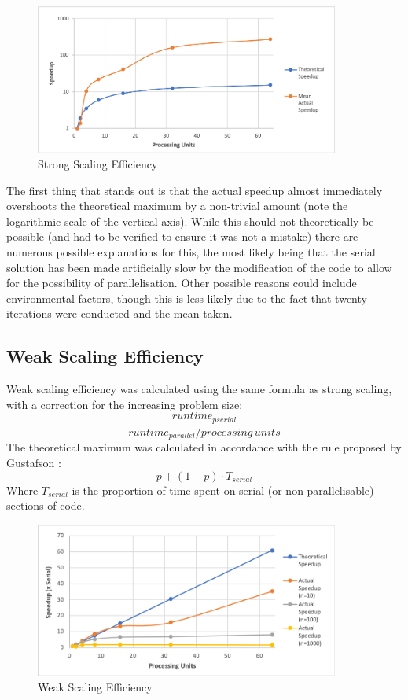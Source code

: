 \begin{figure}[H]
\centering
\includegraphics[width=10cm]{img/strong-scaling.png}
\caption{Strong Scaling Efficiency}
\label{fig:strong-efficiency}
\end{figure}

The first thing that stands out is that the actual speedup almost immediately overshoots the theoretical maximum by a non-trivial amount (note the logarithmic scale of the vertical axis). While this should not theoretically be possible (and had to be verified to ensure it was not a mistake) there are numerous possible explanations for this, the most likely being that the serial solution has been made artificially slow by the modification of the code to allow for the possibility of parallelisation. Other possible reasons could include environmental factors, though this is less likely due to the fact that twenty iterations were conducted and the mean taken.

\subsection{Weak Scaling Efficiency}

Weak scaling efficiency was calculated using the same formula as strong scaling, with a correction for the increasing problem size:
$$\frac{runtime_{pserial}}{runtime_{parallel} / processing\, units}$$
The theoretical maximum was calculated in accordance with the rule proposed by Gustafson \cite{Gustafson}:
$$p + (1 - p) \cdot T_{serial}$$
Where $T_{serial}$ is the proportion of time spent on serial (or non-parallelisable) sections of code.

\begin{figure}[H]
\centering
\includegraphics[width=10cm]{img/weak-scaling.png}
\caption{Weak Scaling Efficiency}
\label{fig:weak-efficiency}
\end{figure}


